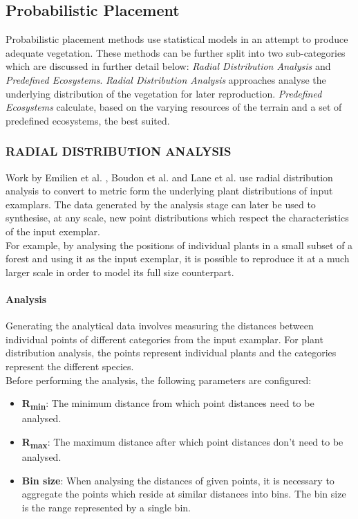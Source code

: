 \subsection{Probabilistic Placement} \label{Probabilistic Placement}

Probabilistic placement methods use statistical models in an attempt to produce adequate vegetation. These methods can be further split into two sub-categories which are discussed in further detail below: \textit{Radial Distribution Analysis} and \textit{Predefined Ecosystems}.
\textit{Radial Distribution Analysis} approaches analyse the underlying distribution of the vegetation for later reproduction. \textit{Predefined Ecosystems} calculate, based on the varying resources of the terrain and a set of predefined ecosystems, the best suited. \\

\subsubsection{RADIAL DISTRIBUTION ANALYSIS}
Work by Emilien et al. \cite{Emilien}, Boudon et al. \cite{Boudon2007} and Lane et al. \cite{Lane2002} use radial distribution analysis to convert to metric form the underlying plant distributions of input examplars. The data generated by the analysis stage can later be used to synthesise, at any scale, new point distributions which respect the characteristics of the input exemplar. \\
For example, by analysing the positions of individual plants in a small subset of a forest and using it as the input exemplar, it is possible to reproduce it at a much larger scale in order to model its full size counterpart.\\

\paragraph{Analysis}
Generating the analytical data involves measuring the distances between individual points of different categories from the input examplar. For plant distribution analysis, the points represent individual plants and the categories represent the different species.\\

Before performing the analysis, the following parameters are configured:
\begin{itemize}
\item \textbf{R\textsubscript{min}}: The minimum distance from which point distances need to be analysed.\\
\item \textbf{R\textsubscript{max}}: The maximum distance after which point distances don't need to be analysed.\\
\item \textbf{Bin size}: When analysing the distances of given points, it is necessary to aggregate the points which reside at similar distances into bins. The bin size is the range represented by a single bin.\\
\end{itemize}

